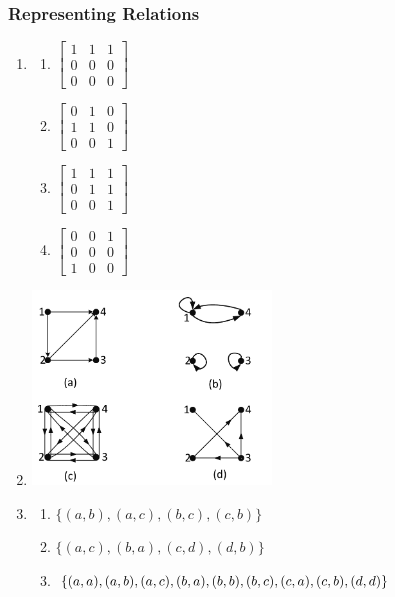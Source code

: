 \documentclass{sig-alternate-05-2015}
\begin{document}
\subsubsection{Representing Relations}
\begin{enumerate}
\item 
\begin{enumerate}
	\item 
	$\begin{bmatrix}
		1 & 1 & 1\\
		0 & 0 & 0\\
		0 & 0 & 0
	\end{bmatrix}$
	\item 
	$\begin{bmatrix}
	0 & 1 & 0\\
	1 & 1 & 0\\
	0 & 0 & 1
	\end{bmatrix}$
	\item 
	$\begin{bmatrix}
	1 & 1 & 1\\
	0 & 1 & 1\\
	0 & 0 & 1
	\end{bmatrix}$
	\item 
	$\begin{bmatrix}
	0 & 0 & 1\\
	0 & 0 & 0\\
	1 & 0 & 0
	\end{bmatrix}$
\end{enumerate}

\item
	\includegraphics[width=0.5\textwidth]{figs/122.pdf}
	
\item
\begin{enumerate}
	\item $\{(a, b), (a, c), (b, c), (c, b)\}$
	\item $\{(a, c), (b, a), (c, d), (d, b)\}$
	\item $\{(a, a), (a, b), (a, c), (b, a), (b, b),\\ (b, c), (c, a),
		(c, b), (d, d)\}$
\end{enumerate}

\end{enumerate}
\end{document}
